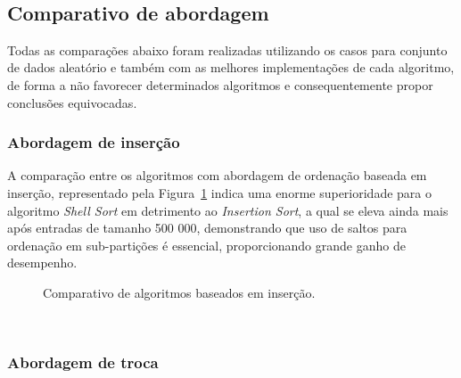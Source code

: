 \documentclass[conference,onecolumn]{IEEEtran}
\begin{document}
~\\
\subsection{Comparativo de abordagem}

Todas as comparações abaixo foram realizadas utilizando os casos para conjunto de dados aleatório e também com as melhores implementações de cada algoritmo, de forma a não favorecer determinados algoritmos e consequentemente propor conclusões equivocadas.
~\\
\subsubsection{Abordagem de inserção}

A comparação entre os algoritmos com abordagem de ordenação baseada em inserção, representado pela Figura~\ref{image: graph-insercao} indica uma enorme superioridade para o algoritmo \textit{Shell Sort} em detrimento ao \textit{Insertion Sort}, a qual se eleva ainda mais após entradas de tamanho 500 000, demonstrando que uso de saltos para ordenação em sub-partições é essencial, proporcionando grande ganho de desempenho.

\begin{figure}[H]
\centering
{}
\caption{Comparativo de algoritmos baseados em inserção.}
\label{image: graph-insercao}
\end{figure}
~\\
\subsubsection{Abordagem de troca}
\end{document}
